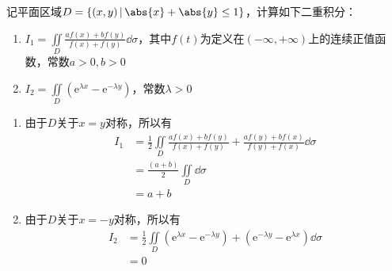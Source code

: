 \begin{example}
    记平面区域$D=\{ (x,y)\,|\, \abs{x}+\abs{y}\leq 1 \}$，计算如下二重积分：
    \begin{enumerate}[(1)]
        \item $\displaystyle I_1 = \iint\limits_D \frac{af(x)+bf(y)}{f(x)+f(y)}\dd{\sigma}$，其中$f(t)$为定义在$(-\infty,+\infty)$上的连续正值函数，常数$a>0,b>0$
        \item $\displaystyle I_2 = \iint\limits_D (\mathrm{e}^{\lambda x} - \mathrm{e}^{-\lambda y})$，常数$\lambda > 0$
    \end{enumerate}
\end{example}
\begin{solution}
    \begin{enumerate}[(1)]
        \item 由于$D$关于$x=y$对称，所以有
              \begin{align*}
                  I_1 & = \frac{1}{2}\iint\limits_D \frac{af(x)+bf(y)}{f(x)+f(y)} + \frac{af(y)+bf(x)}{f(y)+f(x)} \dd{\sigma} \\
                      & =\frac{(a+b)}{2}\iint\limits_D\dd{\sigma}                                                             \\
                      & =a+b
              \end{align*}
        \item 由于$D$关于$x=-y$对称，所以有
              \begin{align*}
                  I_2 & = \frac{1}{2} \iint\limits_D (\mathrm{e}^{\lambda x} - \mathrm{e}^{-\lambda y}) + (\mathrm{e}^{-\lambda y} - \mathrm{e}^{\lambda x}) \dd{\sigma} \\
                      & =0
              \end{align*}
    \end{enumerate}
\end{solution}

